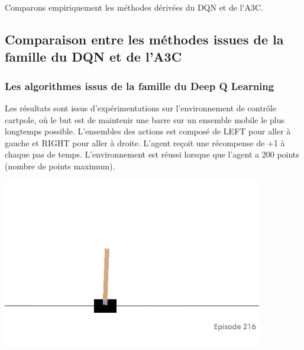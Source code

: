 Comparons empiriquement les méthodes dérivées du DQN et de l'A3C.

\subsection{Comparaison entre les méthodes issues de la famille du DQN et de l'A3C}

\subsubsection{Les algorithmes issus de la famille du Deep Q Learning}


Les résultats sont issus d'expérimentations sur l'environnement de contrôle cartpole, où le but est de maintenir une barre sur un ensemble mobile le plus longtemps possible. L'ensembles des actions est composé de LEFT pour aller à gauche et RIGHT  pour aller à droite. L'agent reçoit une récompense de +1 à chaque pas de temps. L'environnement est réussi lorsque que l'agent a 200 points (nombre de points maximum).

\begin{center}
    \includegraphics[scale=.5]{./assets/DeepLearning/cartpole.png}
\end{center}

